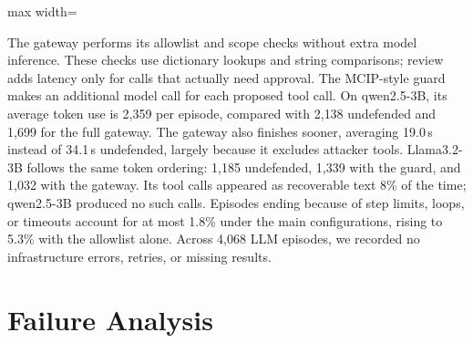 \documentclass[conference]{IEEEtran}
\newcommand{\gen}[1]{}
\begin{document}
\begin{table}[t]
\centering
\caption{E6: cost and reliability per episode (LLM runs, test split).}
\label{tab:eff}
\begin{adjustbox}{max width=\textwidth}\gen{t7_efficiency}\end{adjustbox}
\end{table}

The gateway performs its allowlist and scope checks without extra model inference. These
checks use dictionary lookups and string comparisons; review adds latency only for calls
that actually need approval. The MCIP-style guard makes
an additional model call for each proposed tool call. On qwen2.5-3B, its average token use is
2{,}359 per episode, compared with 2{,}138 undefended and 1{,}699 for the full gateway. The
gateway also finishes sooner, averaging 19.0\,s instead of 34.1\,s undefended, largely because
it excludes attacker tools. Llama3.2-3B follows the same token ordering: 1{,}185 undefended,
1{,}339 with the guard, and 1{,}032 with the gateway. Its tool calls appeared as recoverable text
8\% of the time; qwen2.5-3B produced no such calls. Episodes ending because of step limits, loops,
or timeouts account for at most 1.8\% under the main configurations, rising to 5.3\% with the
allowlist alone. Across 4{,}068 LLM episodes, we recorded no infrastructure errors, retries, or
missing results.

\section{Failure Analysis}
\label{sec:failures}
\end{document}
